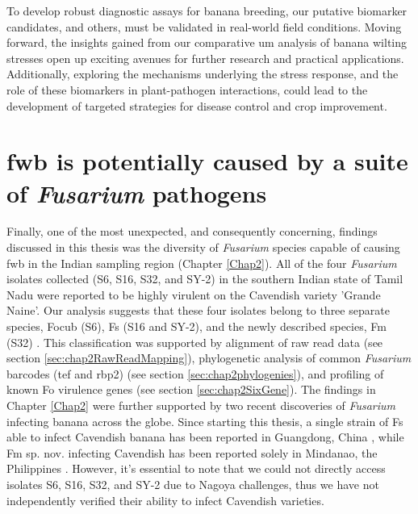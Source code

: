 To develop robust diagnostic assays for banana breeding, our putative biomarker candidates, and others, must be validated in real-world field conditions. Moving forward, the insights gained from our comparative \ac{um} analysis of banana wilting stresses open up exciting avenues for further research and practical applications. Additionally, exploring the mechanisms underlying the stress response, and the role of these biomarkers in plant-pathogen interactions, could lead to the development of targeted strategies for disease control and crop improvement.

\section{\Acl{fwb} is potentially caused by a suite of \textit{Fusarium} pathogens}

Finally, one of the most unexpected, and consequently concerning, findings discussed in this thesis was the diversity of \textit{Fusarium} species capable of causing \ac{fwb} in the Indian sampling region (Chapter \ref{Chap2}). All of the four \textit{Fusarium} isolates collected (S6, S16, S32, and SY-2) in the southern Indian state of Tamil Nadu were reported to be highly virulent on the Cavendish variety 'Grande Naine'. Our analysis suggests that these four isolates belong to three separate species, \acf{Focub} (S6), \acf{Fs} (S16 and SY-2), and the newly described species, \acf{Fm} (S32) \parencite{Nozawa2023}. This classification was supported by alignment of raw read data (see section \ref{sec:chap2RawReadMapping}), phylogenetic analysis of common \textit{Fusarium} barcodes (\ac{tef} and \ac{rbp2}) (see section \ref{sec:chap2phylogenies}), and profiling of known \ac{Fo} virulence genes (see section \ref{sec:chap2SixGene}). The findings in Chapter \ref{Chap2} were further supported by two recent discoveries of \textit{Fusarium} infecting banana across the globe. Since starting this thesis, a single strain of \ac{Fs} able to infect Cavendish banana has been reported in Guangdong, China \parencite{Cui2021}, while \ac{Fm} sp. nov. infecting Cavendish has been reported solely in Mindanao, the Philippines \parencite{Nozawa2023}. However, it's essential to note that we could not directly access isolates S6, S16, S32, and SY-2 due to Nagoya challenges, thus we have not independently verified their ability to infect Cavendish varieties.

